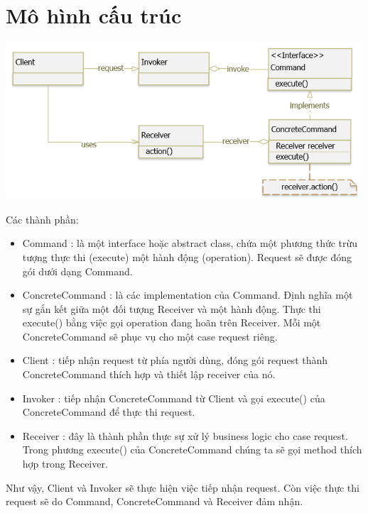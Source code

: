 \section{Mô hình cấu trúc}
\begin{center}
\includegraphics{GALLEYS/images/chapter7/diagram}
\end{center}
Các thành phần:
\begin{itemize}
\item Command : là một interface hoặc abstract class, chứa một phương thức trừu tượng thực thi (execute) một hành động (operation). Request sẽ được đóng gói dưới dạng Command.
\item ConcreteCommand : là các implementation của Command. Định nghĩa một sự gắn kết giữa một đối tượng Receiver và một hành động. Thực thi execute() bằng việc gọi operation đang hoãn trên Receiver. Mỗi một ConcreteCommand sẽ phục vụ cho một case request riêng.
\item Client : tiếp nhận request từ phía người dùng, đóng gói request thành ConcreteCommand thích hợp và thiết lập receiver của nó.
\item Invoker : tiếp nhận ConcreteCommand từ Client và gọi execute() của ConcreteCommand để thực thi request.
\item Receiver : đây là thành phần thực sự xử lý business logic cho case request. Trong phương execute() của ConcreteCommand chúng ta sẽ gọi method thích hợp trong Receiver.
\end{itemize}
Như vậy, Client và Invoker sẽ thực hiện việc tiếp nhận request. Còn việc thực thi request sẽ do Command, ConcreteCommand và Receiver đảm nhận.
